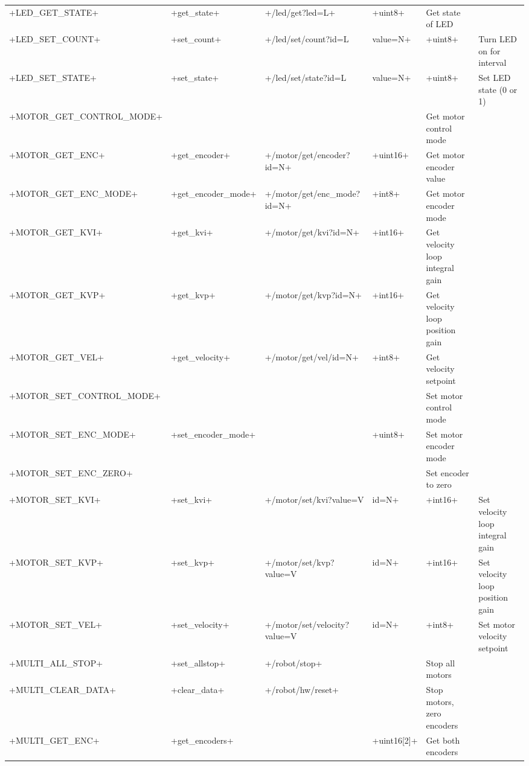\documentclass[11pt,fleqn]{article}
\begin{document}
\begin{landscape}
\begin{longtable}{|l|l|l|l|p{5cm}|}
+LED_GET_STATE+ &          +get_state+ &    +/led/get?led=L+                                  & +uint8+ & Get state of LED \\
+LED_SET_COUNT+ &         +set_count+ & +/led/set/count?id=L&value=N+  & +uint8+ & Turn LED on for interval \\
+LED_SET_STATE+ &           +set_state+ & +/led/set/state?id=L&value=N+   & +uint8+ & Set LED state (0 or 1)\\ \hline
+MOTOR_GET_CONTROL_MODE+ &  &  & & Get motor control mode \\
+MOTOR_GET_ENC+ &   +get_encoder+ &       +/motor/get/encoder?id=N+           & +uint16+ & Get motor encoder value \\
+MOTOR_GET_ENC_MODE+ & +get_encoder_mode+ &    +/motor/get/enc_mode?id=N+     & +int8+ & Get motor encoder mode \\
+MOTOR_GET_KVI+ &  +get_kvi+ &   +/motor/get/kvi?id=N+     &  +int16+ & Get  velocity loop integral gain  \\
+MOTOR_GET_KVP+ & +get_kvp+ &       +/motor/get/kvp?id=N+       & +int16+ & Get  velocity loop position gain  \\
+MOTOR_GET_VEL+ & +get_velocity+ &    +/motor/get/vel/id=N+   & +int8+ & Get  velocity setpoint \\ \hdashline
+MOTOR_SET_CONTROL_MODE+ & &&&  Set motor control mode\\
+MOTOR_SET_ENC_MODE+ & +set_encoder_mode+&                                     & +uint8+ & Set motor encoder mode \\
+MOTOR_SET_ENC_ZERO+ & &                                    & & Set  encoder to zero \\
+MOTOR_SET_KVI+ & +set_kvi+ &    +/motor/set/kvi?value=V&id=N+        & +int16+ &Set  velocity loop integral gain  \\
+MOTOR_SET_KVP+ & +set_kvp+ &   +/motor/set/kvp?value=V&id=N+          &  +int16+ & Set  velocity loop position gain   \\
+MOTOR_SET_VEL+ & +set_velocity+ &  +/motor/set/velocity?value=V&id=N+  & +int8+ & Set  motor velocity setpoint \\ \hline
+MULTI_ALL_STOP+ & +set_allstop+ & +/robot/stop+             & & Stop all motors \\
+MULTI_CLEAR_DATA+ & +clear_data+ &  +/robot/hw/reset+                         & & Stop motors, zero encoders \\
 +MULTI_GET_ENC+ & +get_encoders+ &                 & +uint16[2]+ & Get both encoders \\

\end{longtable}
\end{landscape}
\end{document}
